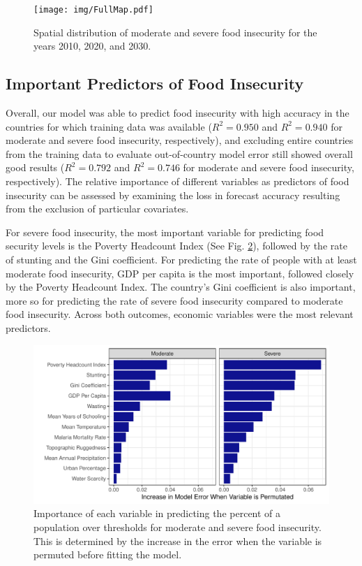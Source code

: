 \documentclass[titlepage]{article}
\begin{document}
\begin{landscape}
\begin{figure}[h]
  \centering
  \texttt{[image: img/FullMap.pdf]}
  \caption{Spatial distribution of moderate and severe food insecurity for the years 2010, 2020, and 2030.}
  \label{fig:map}
\end{figure}
\end{landscape}

\subsection{Important Predictors of Food Insecurity}
Overall, our model was able to predict food insecurity with high accuracy in the countries for which training data was available ($R^2 = 0.950$ and $R^2 = 0.940$ for moderate and severe food insecurity, respectively), and excluding entire countries from the training data to evaluate out-of-country model error still showed overall good results ($R^2 = 0.792$ and $R^2 = 0.746$ for moderate and severe food insecurity, respectively).  The relative importance of different variables as predictors of food insecurity can be assessed by examining the loss in forecast accuracy resulting from the exclusion of particular covariates.

For severe food insecurity, the most important variable for predicting food security levels is the Poverty Headcount Index (See Fig. \ref{fig:vimp}), followed by the rate of stunting and the Gini coefficient.  For predicting the rate of people with at least moderate food insecurity, GDP per capita is the most important, followed closely by the Poverty Headcount Index.  The country's Gini coefficient is also important, more so for predicting the rate of severe food insecurity compared to moderate food insecurity.  Across both outcomes, economic variables were the most relevant predictors.

\begin{figure}[h]
  \centering
  \includegraphics[width=\linewidth]{img/VIMP.pdf}
  \caption{Importance of each variable in predicting the percent of a population over thresholds for moderate and severe food insecurity.  This is determined by the increase in the error when the variable is permuted before fitting the model.}
  \label{fig:vimp}
\end{figure}
\end{document}
